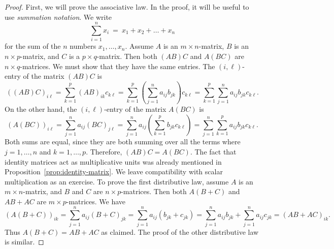 \begin{proof}
  First, we will prove the associative law. In the proof, it will be
  useful to use {\em summation notation}.
  We write
  \begin{equation*}
    \sum_{i=1}^n x_i ~=~ x_1 + x_2 + \ldots + x_n
  \end{equation*}
  for the sum of the $n$ numbers $x_1,\ldots,x_n$. Assume $A$ is an
  $m\times n$-matrix, $B$ is an $n\times p$-matrix, and $C$ is a
  $p\times q$-matrix. Then both $(AB)C$ and $A(BC)$ are
  $n\times q$-matrices. We must show that they have the same
  entries. The $(i,\ell)$-entry of the matrix $(AB)C$ is
  \begin{equation*}
    ((AB)C)_{i\ell} = \sum_{k=1}^p (AB)_{ik}c_{k\ell}
    = \sum_{k=1}^p (\sum_{j=1}^n a_{ij}b_{jk})c_{k\ell}
    = \sum_{k=1}^p\sum_{j=1}^n a_{ij}b_{jk}c_{k\ell}.
  \end{equation*}
  On the other hand, the $(i,\ell)$-entry of the matrix $A(BC)$ is
  \begin{equation*}
    (A(BC))_{i\ell} = \sum_{j=1}^n a_{ij}(BC)_{j\ell}
    = \sum_{j=1}^n a_{ij} (\sum_{k=1}^p b_{jk} c_{k\ell})
    = \sum_{j=1}^n\sum_{k=1}^p a_{ij} b_{jk} c_{k\ell}.
  \end{equation*}
  Both sums are equal, since they are both summing over all the terms
  where $j=1,\ldots,n$ and $k=1,\ldots,p$. Therefore, $(AB)C=A(BC)$.
  The fact that identity matrices act as multiplicative units was
  already mentioned in Proposition~\ref{prop:identity-matrix}.  We
  leave compatibility with scalar multiplication as an exercise.
  To prove the first distributive law, assume $A$ is an
  $m\times n$-matrix, and $B$ and $C$ are $n\times p$-matrices. Then
  both $A(B+C)$ and $AB+AC$ are $m\times p$-matrices. We have
  \begin{equation*}
    (A(B+C))_{ik} = \sum_{j=1}^n a_{ij}(B+C)_{jk}
    = \sum_{j=1}^n a_{ij}(b_{jk}+c_{jk})
    = \sum_{j=1}^n a_{ij}b_{jk} + \sum_{j=1}^n a_{ij}c_{jk}
    = (AB+AC)_{ik}.
  \end{equation*}
  Thus $A(B+C) =AB+AC$ as claimed. The proof of the other distributive
  law is similar.
\end{proof}
